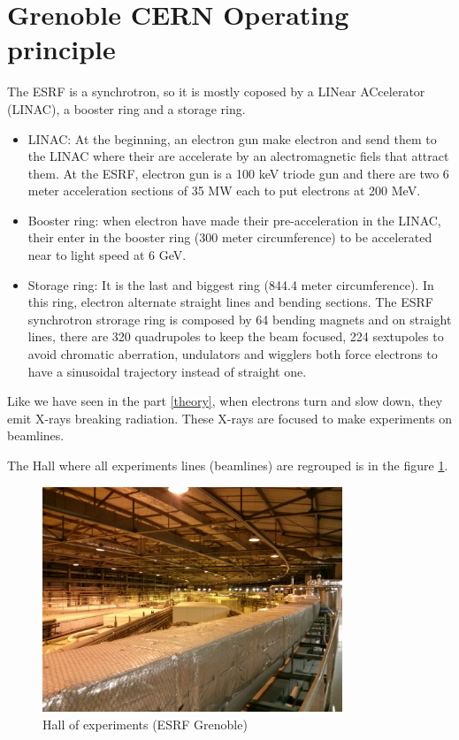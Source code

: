 \documentclass[11pt,a4paper,oneside]{report}
\begin{document}
\newpage
\section{Grenoble CERN Operating principle}

The ESRF is a synchrotron, so it is mostly coposed by a LINear ACcelerator (LINAC), a booster ring and a storage ring.
\begin{itemize}
    \item LINAC: At the beginning, an electron gun make electron and send them to the LINAC where their are accelerate by an alectromagnetic fiels that attract them. At the ESRF, electron gun is a 100 keV triode gun and there are two 6 meter acceleration sections of 35 MW each to put electrons at 200 MeV.
    \item Booster ring: when electron have made their pre-acceleration in the LINAC, their enter in the booster ring (300 meter circumference) to be accelerated near to light speed at 6 GeV.
    \item Storage ring: It is the last and biggest ring (844.4 meter circumference). In this ring, electron alternate straight lines and bending sections. The ESRF synchrotron strorage ring is composed by 64 bending magnets and on straight lines, there are 320 quadrupoles to keep the beam focused, 224 sextupoles to avoid chromatic aberration, undulators and wigglers both force electrons to have a sinusoidal trajectory instead of straight one.
\end{itemize}
\medskip

Like we have seen in the part \ref{theory}, when electrons turn and slow down, they emit X-rays breaking radiation. These X-rays are focused to make experiments on beamlines.\medskip


The Hall where all experiments lines (beamlines) are regrouped is in the figure \ref{Hall}.\medskip

\begin{figure}[H]
    \begin{center}
        \includegraphics[width=0.8\textwidth]{Images/IMG_20151210_213319.jpg}
        \caption{Hall of experiments (ESRF Grenoble)}
        \label{Hall}
    \end{center}
\end{figure}
\medskip
\end{document}
